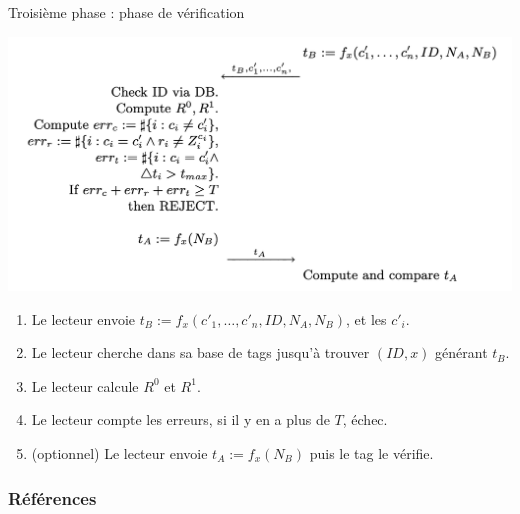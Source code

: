 \documentclass[aspectratio=169]{beamer}
\begin{document}
\begin{frame}{Troisième phase : phase de vérification}
  \begin{multicols}{2}
    \begin{minipage}[c]{\linewidth}
      \centering
      \bigskip
      \bigskip
      \bigskip
      \includegraphics[width=\linewidth]{assets/sk-phase3.png}
    \end{minipage}

    \begin{minipage}[t]{\linewidth}
      \begin{enumerate}
        \item Le lecteur envoie $t_B := f_x(c'_1, \hdots, c'_n, ID, N_A, N_B)$, et les $c'_i$.
        \item Le lecteur cherche dans sa base de tags jusqu'à trouver $(ID, x)$ générant $t_B$.
        \item Le lecteur calcule $R^0$ et $R^1$.
        \item Le lecteur compte les erreurs, si il y en a plus de $T$, échec.
        \item (optionnel) Le lecteur envoie $t_A := f_x(N_B)$ puis le tag le vérifie.
      \end{enumerate}
    \end{minipage}
  \end{multicols}
\end{frame}

\begin{frame}[allowframebreaks]
  \frametitle{Références}
  \printbibliography
\end{frame}
\end{document}
